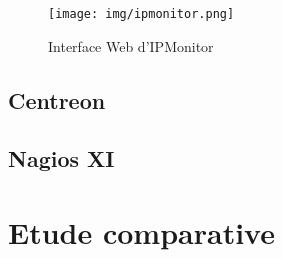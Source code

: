 \documentclass[a4paper,12pt]{report}
\begin{document}
\begin{figure}[!h]
  \texttt{[image: img/ipmonitor.png]}
  \caption{Interface Web d'IPMonitor}
\end{figure}

\section{Centreon}

\section{Nagios XI}

\chapter{Etude comparative}

\maketitle
\tableofcontents

\begin{abstract}
\end{abstract}

\section{}
\end{document}
